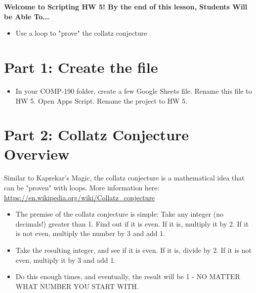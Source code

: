 \documentclass{article}
\newcommand{\AName}{Scripting HW 5}
\begin{document}
\textbf{Welcome to \AName!  By the end of this lesson, Students Will be Able To...}
\begin{itemize}
    \item Use a loop to "prove" the collatz conjecture
\end{itemize}


\section*{Part 1: Create the file}
\begin{itemize}
    \item In your COMP-190 folder, create a few Google Sheets file.  Rename this file to HW 5.  Open Apps Script.  Rename the project to HW 5.
\end{itemize}

\section*{Part 2: Collatz Conjecture Overview}
Similar to Kaprekar's Magic, the collatz conjecture is a mathematical idea that can be "proven" with loops.  More information here:  \url{https://en.wikipedia.org/wiki/Collatz_conjecture}
\begin{itemize}
    \item The premise of the collatz conjecture is simple:  Take any integer (no decimals!) greater than 1.  Find out if it is even.  If it is, multiply it by 2.  If it is not even, multiply the number by 3 and add 1.
    \item Take the resulting integer, and see if it is even.  If it is, divide by 2.  If it is not even, multiply it by 3 and add 1.
    \item Do this enough times, and eventually, the result will be 1 - NO MATTER WHAT NUMBER YOU START WITH.
\end{itemize}
\end{document}
